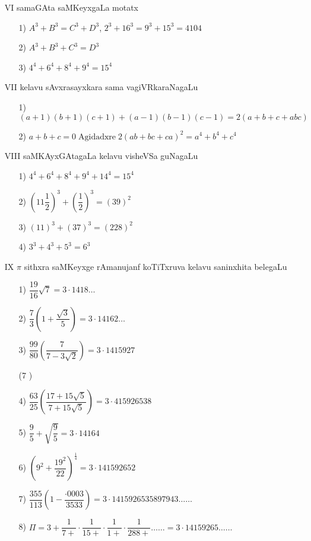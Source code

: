 \begin{enumerate}
\item[{\rm VI}] samaGAta saMKeyxgaLa motatx
\begin{itemize}
\item[{\rm 1)}] $A^{3}+B^{3} = C^{3}+D^{3}$,
$2^{3}+16^{3} = 9^{3}+15^{3} = 4104$
\item[{\rm 2)}] $A^{3}+B^{3}+C^{3}=D^{3}$
\item[{\rm 3)}] $4^{4}+6^{4}+8^{4}+9^{4} = 15^{4}$
\end{itemize}

\item[{\rm VII}] kelavu sAvxrasayxkara sama vagiVRkaraNagaLu
\begin{itemize}
\item[{\rm 1)}] $(a+1)(b+1)(c+1)+(a-1)(b-1)(c-1)=2(a+b+c+abc)$
\item[{\rm 2)}] $a+b+c=0 \; \text{Agidadxre} \; 2(ab+bc+ca)^{2} = a^{4}+b^{4}+c^{4}$
\end{itemize}

\item[{\rm VIII}] saMKAyxGAtagaLa kelavu visheVSa guNagaLu
\begin{itemize}
\item[{\rm 1)}] $4^{4}+6^{4}+8^{4}+9^{4}+14^{4} = 15^{4}$
\item[{\rm 2)}] $\left(11\dfrac{1}{2}\right)^{3}+\left(\dfrac{1}{2}\right)^{3} = (39)^{2}$
\item[{\rm 3)}] $(11)^{3}+(37)^{3} = (228)^{2}$
\item[{\rm 4)}] $3^{3}+4^{3}+5^{3} = 6^{3}$
\end{itemize}

\item[{\rm IX}] $\pi$ sithxra saMKeyxge rAmanujanf koTiTxruva kelavu saninxhita belegaLu
\begin{itemize}
\item[{\rm 1)}] $\dfrac{19}{16}\sqrt{7}=3\cdot 1418\ldots$
\item[{\rm 2)}] $\dfrac{7}{3} \left(1+\dfrac{\sqrt{3}}{5} \right)=3\cdot 14162\ldots$
\item[{\rm 3)}] $\dfrac{99}{80} \left(\dfrac{7}{7-3\sqrt{2}} \right)= 3\cdot 1415927$

({\rm 7} )
\item[{\rm 4)}] $\dfrac{63}{25} \left(\dfrac{17+15\sqrt{5}}{7+15\sqrt{5}}\right) = 3\cdot 415926538$
\item[{\rm 5)}] $\dfrac{9}{5}+\sqrt{\dfrac{9}{5}}=3\cdot 14164$
\item[{\rm 6)}] $\left(9^{2}+\dfrac{19^{2}}{22} \right)^{\frac{1}{4}}=3\cdot 14 1592652$
\item[{\rm 7)}] $\dfrac{355}{113} \left(1-\dfrac{\cdot0003}{3533}\right)=3\cdot 1415926535897943\ldots\ldots$
\item[{\rm 8)}] $\Pi=3+\dfrac{1}{7+}\cdot \dfrac{1}{15+}\cdot \dfrac{1}{1+}\cdot \dfrac{1}{288+}\ldots\ldots=3\cdot 14 159265\ldots\ldots$
\end{itemize}


\end{enumerate}
